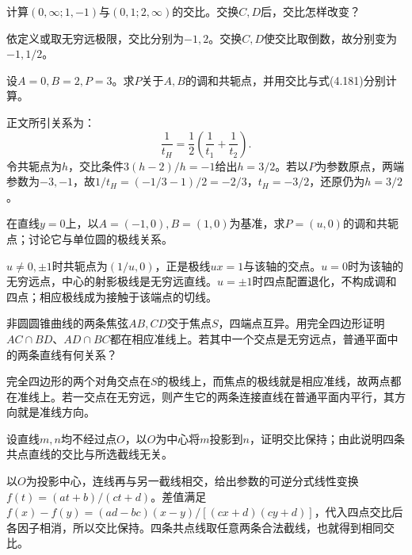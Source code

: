 计算\((0,\infty;1,-1)\)与\((0,1;2,\infty)\)的交比。交换\(C,D\)后，交比怎样改变？
\par
\solutionanswer
依定义或取无穷远极限，交比分别为\(-1,2\)。交换\(C,D\)使交比取倒数，故分别变为\(-1,1/2\)。


设\(A=0,B=2,P=3\)。求\(P\)关于\(A,B\)的调和共轭点，并用交比与式\textup{(4.181)}分别计算。
\par

\par\smallskip\noindent 正文所引关系为：
\begin{equation*}
\frac1{t_H}=\frac12\left(\frac1{t_1}+\frac1{t_2}\right).
\end{equation*}
\solutionanswer
令共轭点为\(h\)，交比条件\(3(h-2)/h=-1\)给出\(h=3/2\)。若以\(P\)为参数原点，两端参数为\(-3,-1\)，故\(1/t_H=(-1/3-1)/2=-2/3\)，\(t_H=-3/2\)，还原仍为\(h=3/2\)。


在直线\(y=0\)上，以\(A=(-1,0),B=(1,0)\)为基准，求\(P=(u,0)\)的调和共轭点；讨论它与单位圆的极线关系。
\par
\solutionanswer
\(u\ne0,\pm1\)时共轭点为\((1/u,0)\)，正是极线\(ux=1\)与该轴的交点。\(u=0\)时为该轴的无穷远点，中心的射影极线是无穷远直线。\(u=\pm1\)时四点配置退化，不构成调和四点；相应极线成为接触于该端点的切线。


非圆圆锥曲线的两条焦弦\(AB,CD\)交于焦点\(S\)，四端点互异。用完全四边形证明\(AC\cap BD\)、\(AD\cap BC\)都在相应准线上。若其中一个交点是无穷远点，普通平面中的两条直线有何关系？
\par
\solutionanswer
完全四边形的两个对角交点在\(S\)的极线上，而焦点的极线就是相应准线，故两点都在准线上。若一交点在无穷远，则产生它的两条连接直线在普通平面内平行，其方向就是准线方向。


设直线\(m,n\)均不经过点\(O\)，以\(O\)为中心将\(m\)投影到\(n\)，证明交比保持；由此说明四条共点直线的交比与所选截线无关。
\par
\solutionanswer
以\(O\)为投影中心，连线再与另一截线相交，给出参数的可逆分式线性变换\(f(t)=(at+b)/(ct+d)\)。差值满足\(f(x)-f(y)=(ad-bc)(x-y)/[(cx+d)(cy+d)]\)，代入四点交比后各因子相消，所以交比保持。四条共点线取任意两条合法截线，也就得到相同交比。


